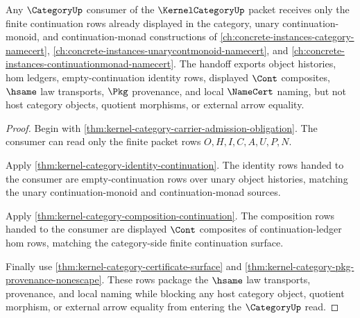 \begin{theorem}
\label{thm:kernel-category-category-continuation-handoff}
Any $\CategoryUp$ consumer of the $\KernelCategoryUp$ packet receives only the
finite continuation rows already displayed in the category, unary
continuation-monoid, and continuation-monad constructions of
\autoref{ch:concrete-instances-category-namecert},
\autoref{ch:concrete-instances-unarycontmonoid-namecert}, and
\autoref{ch:concrete-instances-continuationmonad-namecert}. The handoff
exports object histories, hom ledgers, empty-continuation identity rows,
displayed $\Cont$ composites, $\hsame$ law transports, $\Pkg$ provenance, and
local $\NameCert$ naming, but not host category objects, quotient morphisms, or
external arrow equality.
\end{theorem}
\begin{proof}
Begin with \autoref{thm:kernel-category-carrier-admission-obligation}. The
consumer can read only the finite packet rows $O,H,I,C,A,U,P,N$.

Apply \autoref{thm:kernel-category-identity-continuation}. The identity rows
handed to the consumer are empty-continuation rows over unary object histories,
matching the unary continuation-monoid and continuation-monad sources.

Apply \autoref{thm:kernel-category-composition-continuation}. The composition
rows handed to the consumer are displayed $\Cont$ composites of
continuation-ledger hom rows, matching the category-side finite continuation
surface.

Finally use \autoref{thm:kernel-category-certificate-surface} and
\autoref{thm:kernel-category-pkg-provenance-nonescape}. These rows package the
$\hsame$ law transports, provenance, and local naming while blocking any host
category object, quotient morphism, or external arrow equality from entering
the $\CategoryUp$ read.
\end{proof}

